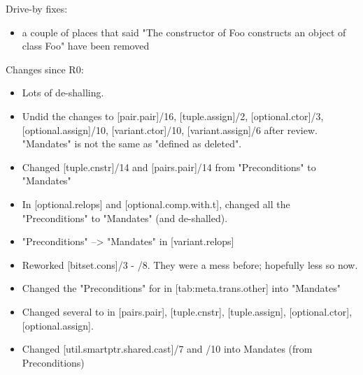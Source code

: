 %
%


Drive-by fixes:
\begin{itemize}
\item{a couple of places that said "The constructor of Foo constructs an object of class Foo" have been removed}
\end{itemize}

Changes since R0:
\begin{itemize}
\item{Lots of de-shalling.}
\item{Undid the changes to [pair.pair]/16, [tuple.assign]/2, [optional.ctor]/3, 
 [optional.assign]/10, [variant.ctor]/10, [variant.assign]/6 after review. "Mandates" is not the same as "defined as deleted".}
\item{Changed [tuple.cnstr]/14 and [pairs.pair]/14 from "Preconditions" to "Mandates"}
\item{In [optional.relops] and [optional.comp.with.t], changed all the "Preconditions" to "Mandates" (and de-shalled).}
\item{"Preconditions" --> "Mandates" in [variant.relops]}
\item{Reworked [bitset.cons]/3 - /8. They were a mess before; hopefully less so now.}
\item{Changed the "Preconditions" for  in [tab:meta.trans.other] into "Mandates"}
\item{Changed several  to  in [pairs.pair], [tuple.cnstr], [tuple.assign], [optional.ctor], [optional.assign].}
\item{Changed [util.smartptr.shared.cast]/7 and /10 into Mandates (from Preconditions)}
\end{itemize}

